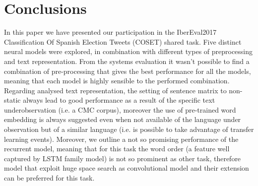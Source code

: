 \section{Conclusions} \label{sec:conclusion}

In this paper we have presented our participation in the IberEval2017 Classification Of Spanish Election Tweets (COSET) shared task. Five distinct neural models were explored, in combination with different types of preprocessing and text representation.
From the systems evaluation it wasn't possible to find a combination of pre-processing that gives the best performance for all the models, meaning that each model is highly sensible to the performed combination.
Regarding analysed text representation, the setting of sentence matrix to non-static always lead to good performance as a result of the specific text underobservation (i.e. a CMC corpus), moreover the use of pre-trained word embedding is always suggested even when not available of the language under observation but of a similar language (i.e. is possible to take advantage of transfer learning events).
Moreover, we outline a not so promising performance of the recurrent model, meaning that for this task the word order (a feature well captured by LSTM family model) is not so prominent as other task, therefore model that exploit huge space search as convolutional model and their extension can be preferred for this task.